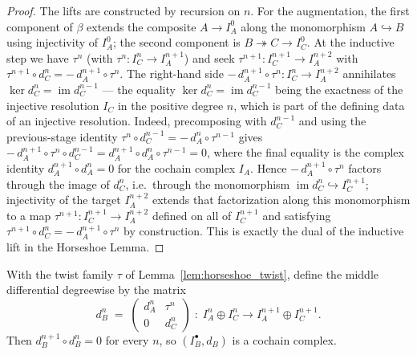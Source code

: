 \begin{proof}
  The lifts are constructed by recursion on \(n\). For the augmentation, the first
  component of \(\beta\) extends the composite \(A \to I_A^0\) along the monomorphism
  \(A \hookrightarrow B\) using injectivity of \(I_A^0\); the second component is
  \(B \twoheadrightarrow C \to I_C^0\).
  At the inductive step we have \(\tau^{n}\) (with \(\tau^{n} : I_C^{n} \to I_A^{n+1}\))
  and seek \(\tau^{n+1} : I_C^{n+1} \to I_A^{n+2}\) with
  \(\tau^{n+1} \circ d_C^n = -\,d_A^{n+1} \circ \tau^n\). The right-hand side
  \(-\,d_A^{n+1} \circ \tau^n : I_C^n \to I_A^{n+2}\) annihilates
  \(\ker d_C^n = \operatorname{im} d_C^{n-1}\) --- the equality \(\ker d_C^n =
  \operatorname{im} d_C^{n-1}\) being the exactness of the injective resolution \(I_C\) in
  the positive degree \(n\), which is part of the defining data of an injective resolution.
  Indeed, precomposing with \(d_C^{n-1}\) and using the
  previous-stage identity \(\tau^{n} \circ d_C^{n-1} = -\,d_A^{n} \circ \tau^{n-1}\) gives
  \(-\,d_A^{n+1} \circ \tau^n \circ d_C^{n-1} = d_A^{n+1} \circ d_A^{n} \circ \tau^{n-1} = 0\),
  where the final equality is the complex identity \(d_A^{n+1} \circ d_A^{n} = 0\) for the
  cochain complex \(I_A\). Hence
  \(-\,d_A^{n+1} \circ \tau^n\) factors through the image of \(d_C^n\), i.e.\ through the
  monomorphism \(\operatorname{im} d_C^n \hookrightarrow I_C^{n+1}\); injectivity of the
  target \(I_A^{n+2}\) extends that factorization along this monomorphism to a map
  \(\tau^{n+1} : I_C^{n+1} \to I_A^{n+2}\) defined on all of \(I_C^{n+1}\) and satisfying
  \(\tau^{n+1} \circ d_C^n = -\,d_A^{n+1} \circ \tau^n\) by construction. This is exactly
  the dual of the inductive lift in the Horseshoe Lemma.
\end{proof}

\begin{lemma}\leanok
  \label{lem:horseshoe_dComp}
  With the twist family \(\tau\) of Lemma~\ref{lem:horseshoe_twist}, define the middle
  differential degreewise by the matrix
  \[
    d_B^n \;=\;
    \begin{pmatrix} d_A^n & \tau^n \\ 0 & d_C^n \end{pmatrix}
    \;:\; I_A^n \oplus I_C^n \longrightarrow I_A^{n+1} \oplus I_C^{n+1}.
  \]
  Then \(d_B^{n+1} \circ d_B^n = 0\) for every \(n\), so \((I_B^\bullet, d_B)\) is a
  cochain complex.
\end{lemma}

